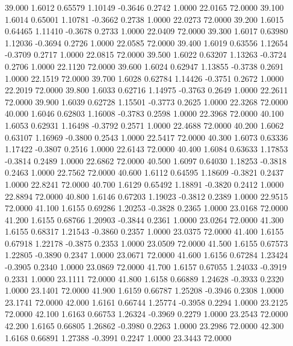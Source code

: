   39.000   1.6012   0.65579   1.10149  -0.3646   0.2742   1.0000  22.0165  72.0000
  39.100   1.6014   0.65001   1.10781  -0.3662   0.2738   1.0000  22.0273  72.0000
  39.200   1.6015   0.64465   1.11410  -0.3678   0.2733   1.0000  22.0409  72.0000
  39.300   1.6017   0.63980   1.12036  -0.3694   0.2726   1.0000  22.0585  72.0000
  39.400   1.6019   0.63556   1.12654  -0.3709   0.2717   1.0000  22.0815  72.0000
  39.500   1.6022   0.63207   1.13263  -0.3724   0.2706   1.0000  22.1120  72.0000
  39.600   1.6024   0.62947   1.13855  -0.3738   0.2691   1.0000  22.1519  72.0000
  39.700   1.6028   0.62784   1.14426  -0.3751   0.2672   1.0000  22.2019  72.0000
  39.800   1.6033   0.62716   1.14975  -0.3763   0.2649   1.0000  22.2611  72.0000
  39.900   1.6039   0.62728   1.15501  -0.3773   0.2625   1.0000  22.3268  72.0000
  40.000   1.6046   0.62803   1.16008  -0.3783   0.2598   1.0000  22.3968  72.0000
  40.100   1.6053   0.62931   1.16498  -0.3792   0.2571   1.0000  22.4688  72.0000
  40.200   1.6062   0.63107   1.16969  -0.3800   0.2543   1.0000  22.5417  72.0000
  40.300   1.6073   0.63336   1.17422  -0.3807   0.2516   1.0000  22.6143  72.0000
  40.400   1.6084   0.63633   1.17853  -0.3814   0.2489   1.0000  22.6862  72.0000
  40.500   1.6097   0.64030   1.18253  -0.3818   0.2463   1.0000  22.7562  72.0000
  40.600   1.6112   0.64595   1.18609  -0.3821   0.2437   1.0000  22.8241  72.0000
  40.700   1.6129   0.65492   1.18891  -0.3820   0.2412   1.0000  22.8894  72.0000
  40.800   1.6146   0.67203   1.19023  -0.3812   0.2389   1.0000  22.9515  72.0000
  41.100   1.6155   0.69286   1.20253  -0.3828   0.2365   1.0000  23.0168  72.0000
  41.200   1.6155   0.68766   1.20903  -0.3844   0.2361   1.0000  23.0264  72.0000
  41.300   1.6155   0.68317   1.21543  -0.3860   0.2357   1.0000  23.0375  72.0000
  41.400   1.6155   0.67918   1.22178  -0.3875   0.2353   1.0000  23.0509  72.0000
  41.500   1.6155   0.67573   1.22805  -0.3890   0.2347   1.0000  23.0671  72.0000
  41.600   1.6156   0.67284   1.23424  -0.3905   0.2340   1.0000  23.0869  72.0000
  41.700   1.6157   0.67055   1.24033  -0.3919   0.2331   1.0000  23.1111  72.0000
  41.800   1.6158   0.66889   1.24628  -0.3933   0.2320   1.0000  23.1401  72.0000
  41.900   1.6159   0.66787   1.25208  -0.3946   0.2308   1.0000  23.1741  72.0000
  42.000   1.6161   0.66744   1.25774  -0.3958   0.2294   1.0000  23.2125  72.0000
  42.100   1.6163   0.66753   1.26324  -0.3969   0.2279   1.0000  23.2543  72.0000
  42.200   1.6165   0.66805   1.26862  -0.3980   0.2263   1.0000  23.2986  72.0000
  42.300   1.6168   0.66891   1.27388  -0.3991   0.2247   1.0000  23.3443  72.0000

